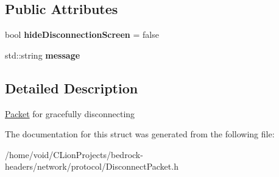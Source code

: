 \subsection*{Public Attributes}
\begin{DoxyCompactItemize}
\item 
\mbox{\label{struct_disconnect_packet_a4d23f2289b6a85847349f1c6f6295ffa}} 
bool {\bfseries hide\+Disconnection\+Screen} = false
\item 
\mbox{\label{struct_disconnect_packet_a6880245df37662a6d03c84e476f7cda7}} 
std\+::string {\bfseries message}
\end{DoxyCompactItemize}


\subsection{Detailed Description}
\mbox{\hyperlink{struct_packet}{Packet}} for gracefully disconnecting 

The documentation for this struct was generated from the following file\+:\begin{DoxyCompactItemize}
\item 
/home/void/\+C\+Lion\+Projects/bedrock-\/headers/network/protocol/Disconnect\+Packet.\+h\end{DoxyCompactItemize}
